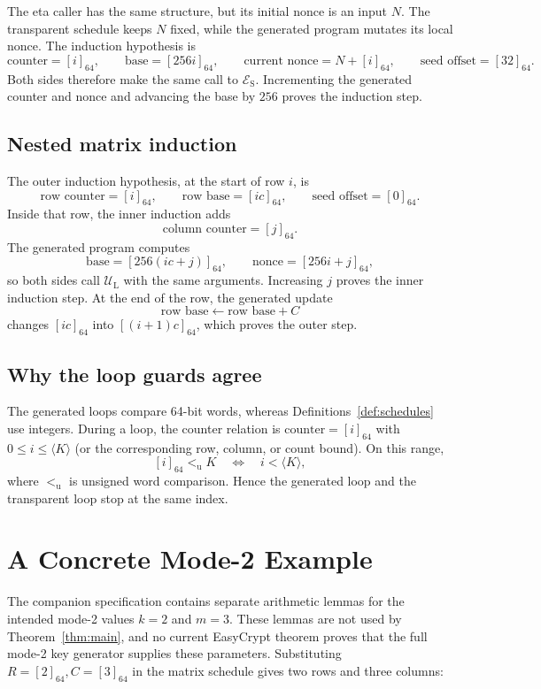 \documentclass[11pt]{article}
\theoremstyle{definition}
\theoremstyle{plain}
\theoremstyle{remark}
\newcommand{\enc}[1]{\left[#1\right]_{64}}
\newcommand{\uint}[1]{\langle #1\rangle}
\newcommand{\UL}{\mathcal U_{\mathrm L}}
\newcommand{\ES}{\mathcal E_{\mathrm S}}
\begin{document}
The eta caller has the same structure, but its initial nonce is an input $N$.
The transparent schedule keeps $N$ fixed, while the generated program mutates
its local nonce.  The induction hypothesis is
\[
  \text{counter}=\enc{i},\qquad
  \text{base}=\enc{256i},\qquad
  \text{current nonce}=N+\enc{i},\qquad
  \text{seed offset}=\enc{32}.
\]
Both sides therefore make the same call to $\ES$.  Incrementing the generated
counter and nonce and advancing the base by $256$ proves the induction step.

\subsection{Nested matrix induction}

The outer induction hypothesis, at the start of row $i$, is
\[
  \text{row counter}=\enc{i},\qquad
  \text{row base}=\enc{ic},\qquad
  \text{seed offset}=\enc{0}.
\]
Inside that row, the inner induction adds
\[
  \text{column counter}=\enc{j}.
\]
The generated program computes
\[
  \text{base}=\enc{256(ic+j)},\qquad
  \text{nonce}=\enc{256i+j},
\]
so both sides call $\UL$ with the same arguments.  Increasing $j$ proves the
inner induction step.  At the end of the row, the generated update
\[
  \text{row base}\leftarrow \text{row base}+C
\]
changes $\enc{ic}$ into $\enc{(i+1)c}$, which proves the outer step.

\subsection{Why the loop guards agree}

The generated loops compare 64-bit words, whereas Definitions~\ref{def:schedules}
use integers.  During a loop, the counter relation is $\text{counter}=\enc{i}$
with $0\le i\le\uint{K}$ (or the corresponding row, column, or count bound).
On this range,
\[
  \enc{i}<_{\mathrm u}K
  \quad\Longleftrightarrow\quad
  i<\uint{K},
\]
where $<_{\mathrm u}$ is unsigned word comparison.  Hence the generated loop
and the transparent loop stop at the same index.

\section{A Concrete Mode-2 Example}

The companion specification contains separate arithmetic lemmas for the
intended mode-2 values $k=2$ and $m=3$.  These lemmas are not used by
Theorem~\ref{thm:main}, and no current EasyCrypt theorem proves that the full
mode-2 key generator supplies these parameters.  Substituting
$R=\enc{2},C=\enc{3}$ in the matrix schedule gives two rows and three columns:
\end{document}
